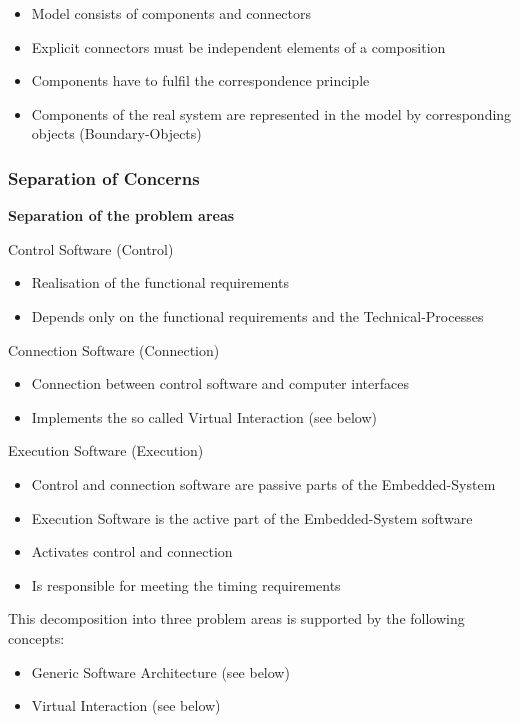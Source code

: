 \begin{itemize}
\tightlist
\item
  Model consists of components and connectors
\item
  Explicit connectors must be independent elements of a composition
\item
  Components have to fulfil the correspondence principle
\item
  Components of the real system are represented in the model by
  corresponding objects (Boundary-Objects)
\end{itemize}

\hypertarget{separation-of-concerns}{%
\subsubsection{Separation of Concerns}\label{separation-of-concerns}}

\textbf{Separation of the problem areas}

Control Software (Control) 
\begin{itemize}
    \item Realisation of the functional requirements
    \item Depends only on the functional requirements and the Technical-Processes
\end{itemize}

Connection Software (Connection)
\begin{itemize}
    \item Connection between control software and computer interfaces
    \item Implements the so called Virtual Interaction (see below)
\end{itemize}

Execution Software (Execution) 
\begin{itemize}
    \item Control and connection software are passive parts of the Embedded-System
    \item Execution Software is the active part of the Embedded-System software
    \item Activates control and connection
    \item Is responsible for meeting the timing requirements
\end{itemize} 

This decomposition into three problem areas is supported by the
following concepts: 
\begin{itemize}
    \item Generic Software Architecture (see below)
    \item Virtual Interaction (see below)
\end{itemize}

